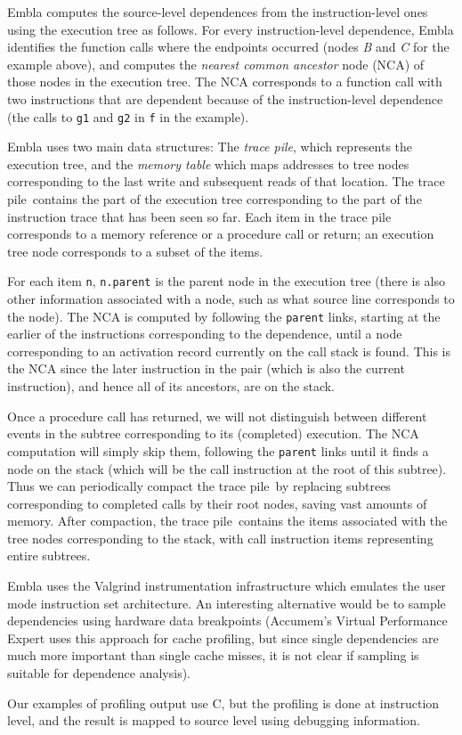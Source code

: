 Embla computes the source-level dependences
from the instruction-level ones using the execution tree as follows. For
every instruction-level dependence, Embla identifies the function calls
where the endpoints occurred (nodes {\it B} and {\it C} for the example
above), and computes the {\em nearest common ancestor} node (NCA) of
those nodes in the execution tree. The NCA corresponds to a function
call with two instructions that are dependent because of
the instruction-level dependence (the calls to {\tt g1} and {\tt g2} in 
{\tt f} in the example).

\newcommand{\tracepile}{trace pile}


Embla uses two main data structures: The {\em \tracepile}, which represents
the execution tree, and the {\em memory table} which maps addresses to tree
nodes corresponding to the last write and subsequent reads of that
location. The \tracepile\ contains the part of the execution tree
corresponding to the part of the instruction trace that has been
seen so far. Each item in the trace pile corresponds to a memory reference 
or a procedure call or return; an execution tree node corresponds to
a subset of the items.

For each item {\tt n}, {\tt n.parent} is the parent node in the
execution tree (there is also other information associated with a
node, such as what source line corresponds to the node).  The NCA is
computed by following the {\tt parent} links, starting at the earlier
of the instructions corresponding to the dependence, until a node
corresponding to an activation record currently on the call stack is
found. This is the NCA since the later instruction in the pair (which
is also the current instruction), and hence all of its ancestors, are
on the stack.

Once a procedure call has returned, we will not distinguish between 
different events in the subtree corresponding to its (completed) 
execution. The NCA computation will simply skip them, following the 
{\tt parent} links until it finds a node on the stack (which will be
the call instruction at the root of this subtree). Thus we can 
periodically compact the \tracepile\ by replacing subtrees
corresponding to completed calls by their root nodes, saving vast amounts
of memory.
After compaction, the \tracepile\ contains the items associated with the
tree nodes corresponding to the stack, with call instruction items
representing entire subtrees.

Embla uses the Valgrind instrumentation infrastructure which emulates
the user mode instruction set architecture. An interesting alternative
would be to sample dependencies using hardware data breakpoints
(Accumem's Virtual Performance Expert uses this approach for cache
profiling, but since single dependencies are much more important than
single cache misses, it is not clear if sampling is suitable for
dependence analysis).

Our examples of profiling
output use C, but
the profiling is done at instruction level, and the result is
mapped to source level using debugging information.


